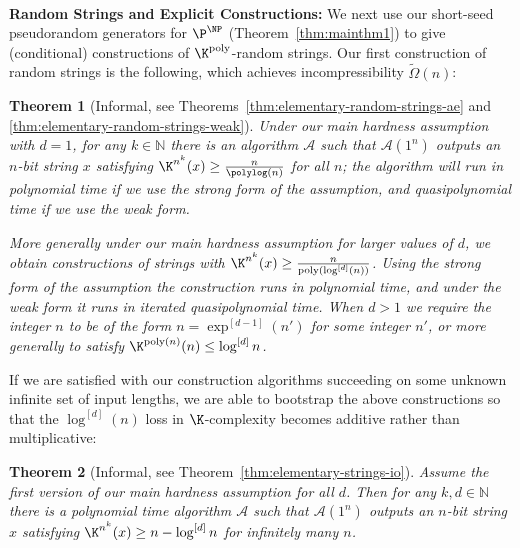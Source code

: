 \documentclass[11pt]{article}
\newtheorem{theorem}{Theorem}
\renewcommand{\poly}{\mathrm{poly}}
\begin{document}
~\\
{\bf \noindent Random Strings and Explicit Constructions:} We next use our short-seed pseudorandom generators for $\P^{\NP} $ (Theorem~\ref{thm:mainthm1}) to give (conditional) constructions of $\K^{\poly}$-random strings. Our first construction of random strings is the following, which achieves incompressibility $\tilde{\Omega}(n)$:
\begin{theorem}[Informal, see Theorems~\ref{thm:elementary-random-strings-ae} and \ref{thm:elementary-random-strings-weak}]
\label{thm:mainthm2}
Under our main hardness assumption with $d=1$, for any $k \in \mathbb{N}$ there is an algorithm $\mathcal{A}$ such that $\mathcal{A}(1^n)$ outputs an $n$-bit string $x$ satisfying $\K^{n^k}(x) \geq \frac{n}{\polylog(n)}$ for all $n$; the algorithm will run in polynomial time if we use the strong form of the assumption, and quasipolynomial time if we use the weak form.

More generally under our main hardness assumption for larger values of $d$, we obtain constructions of strings with $\K^{n^k}(x) \geq \frac{n}{\poly(\log^{[d]}(n))}$. Using the strong form of the assumption the construction runs in polynomial time, and under the weak form it runs in iterated quasipolynomial time. When $d > 1$ we require the integer $n$ to be of the form $n = \exp^{[d-1]}(n')$ for some integer $n'$, or more generally to satisfy $\K^{\poly(n)}(n) \leq \log^{[d]}n$.
\end{theorem}

If we are satisfied with our construction algorithms succeeding on some unknown infinite set of input lengths, we are able to bootstrap the above constructions so that the $\log^{[d]}(n)$ loss in $\K$-complexity becomes additive rather than multiplicative:
\begin{theorem}[Informal, see Theorem~\ref{thm:elementary-strings-io}]
\label{thm:mainthm3}
Assume the first version of our main hardness assumption for all $d$.
Then for any $k,d \in \mathbb{N}$ there is a polynomial time algorithm $\mathcal{A}$ such that $\mathcal{A}(1^n)$ outputs an $n$-bit string $x$ satisfying $\K^{n^k}(x) \geq n - \log^{[d]}n$ for infinitely many $n$.
\end{theorem}
\end{document}
